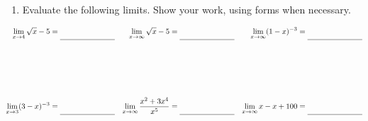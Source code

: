 \documentclass[10pt]{article}
\begin{document}




\begin{enumerate}
\item[1.] Evaluate the following limits. Show your work, using forms when necessary.
\end{enumerate}

\begin{align*}
\lim_{x \rightarrow 4} \sqrt{x} - 5 &=\rule[-8pt]{1in}{0.4pt} & \lim_{x \rightarrow \infty} \sqrt{x} - 5 &=\rule[-8pt]{1in}{0.4pt} & \lim_{x \rightarrow \infty} (1-x)^{-3} &=\rule[-8pt]{1in}{0.4pt}\\[1in]
%
\lim_{x \rightarrow 3} (3-x)^{-3} &=\rule[-8pt]{1in}{0.4pt} & \lim_{x \rightarrow \infty} \frac{x^2 + 3x^4}{x^5} &=\rule[-8pt]{1in}{0.4pt} & \lim_{x \rightarrow \infty} x - x + 100 &=\rule[-8pt]{1in}{0.4pt}\\[1in]
\end{align*} 
\end{document}
